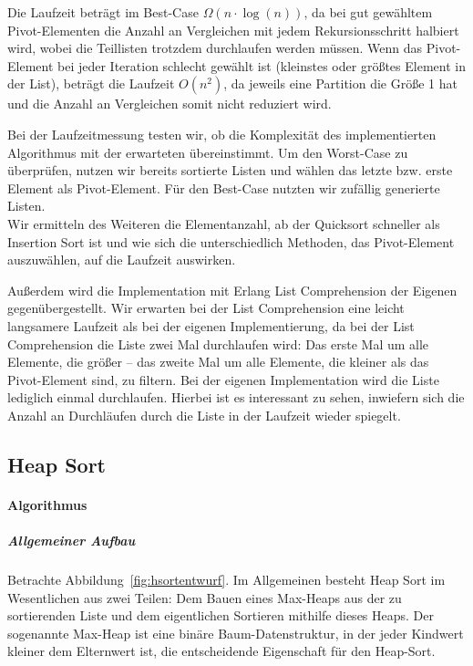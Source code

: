 Die Laufzeit beträgt im Best-Case \(\Omega (n \cdot \log(n))\), da bei
gut gewähltem Pivot-Elementen die Anzahl an Vergleichen mit jedem
Rekursionsschritt halbiert wird, wobei die Teillisten trotzdem durchlaufen
werden müssen.
Wenn das Pivot-Element bei jeder Iteration schlecht gewählt ist (kleinstes
oder größtes Element in der List), beträgt die Laufzeit \(O(n^2)\), da
jeweils eine Partition die Größe 1 hat und die Anzahl an Vergleichen
somit nicht reduziert wird.

Bei der Laufzeitmessung testen wir, ob die Komplexität des implementierten
Algorithmus mit der erwarteten übereinstimmt.
Um den Worst-Case zu überprüfen, nutzen wir bereits sortierte Listen und
wählen das letzte bzw. erste Element als Pivot-Element.
Für den Best-Case nutzten wir zufällig generierte Listen.\\

Wir ermitteln des Weiteren die Elementanzahl, ab der Quicksort schneller
als Insertion Sort ist und wie sich die unterschiedlich Methoden, das
Pivot-Element auszuwählen, auf die Laufzeit auswirken.

Außerdem wird die Implementation mit Erlang List Comprehension der
Eigenen gegenübergestellt.
Wir erwarten bei der List Comprehension eine leicht langsamere Laufzeit als
bei der eigenen Implementierung, da bei der List Comprehension die Liste
zwei Mal durchlaufen wird:
Das erste Mal um alle Elemente, die größer -- das zweite Mal
um alle Elemente, die kleiner als das Pivot-Element sind, zu filtern.
Bei der eigenen Implementation wird die Liste lediglich einmal
durchlaufen.
Hierbei ist es interessant zu sehen, inwiefern sich die Anzahl an
Durchläufen durch die Liste in der Laufzeit wieder spiegelt.


\subsection{Heap Sort}\label{subsec:heap-sort}

\paragraph{Algorithmus}\label{subsubsec:halgorithmus}

\subparagraph{Allgemeiner Aufbau}
Betrachte Abbildung~\ref{fig:hsortentwurf}.
Im Allgemeinen besteht Heap Sort im Wesentlichen aus zwei Teilen:
Dem Bauen eines Max-Heaps aus der zu sortierenden Liste und dem
eigentlichen Sortieren mithilfe dieses Heaps.
Der sogenannte Max-Heap ist eine binäre Baum-Datenstruktur, in der jeder
Kindwert kleiner dem Elternwert ist, die entscheidende Eigenschaft für
den Heap-Sort.

